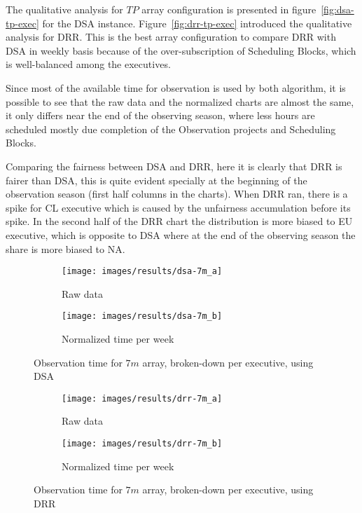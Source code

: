 The qualitative analysis for $TP$ array configuration is presented in figure~\ref{fig:dsa-tp-exec} for the DSA instance. Figure~\ref{fig:drr-tp-exec} introduced the qualitative analysis for DRR. This is the best array configuration to compare DRR with DSA in weekly basis because of the over-subscription of Scheduling Blocks, which is well-balanced among the executives.

Since most of the available time for observation is used by both algorithm, it is possible to see that the raw data and the normalized charts are almost the same, it only differs near the end of the observing season, where less hours are scheduled mostly due completion of the Observation projects and Scheduling Blocks.

Comparing the fairness between DSA and DRR, here it is clearly that DRR is fairer than DSA, this is quite evident specially at the beginning of the observation season (first half columns in the charts). When DRR ran, there is a spike for CL executive which is caused by the unfairness accumulation before its spike. In the second half of the DRR chart the distribution is more biased to EU executive, which is opposite to DSA where at the end of the observing season the share is more biased to NA.

\begin{figure}[t]
\centering
	\begin{subfigure}[b]{0.49\textwidth}
		\texttt{[image: images/results/dsa-7m\_a]}
        \caption{Raw data} 
    \end{subfigure} 
    \begin{subfigure}[b]{0.49\textwidth}
    		\texttt{[image: images/results/dsa-7m\_b]}
            \caption{Normalized time per week} 
    \end{subfigure}
    \caption{Observation time for $7m$ array, broken-down per executive, using DSA}
    \label{fig:dsa-7m-exec}
\end{figure}

\begin{figure}[t]
\centering
	\begin{subfigure}[b]{0.49\textwidth}
		\texttt{[image: images/results/drr-7m\_a]}
        \caption{Raw data} 
    \end{subfigure} 
    \begin{subfigure}[b]{0.49\textwidth}
    		\texttt{[image: images/results/drr-7m\_b]}
            \caption{Normalized time per week} 
    \end{subfigure}
    \caption{Observation time for $7m$ array, broken-down per executive, using DRR}
    \label{fig:drr-7m-exec}
\end{figure}

